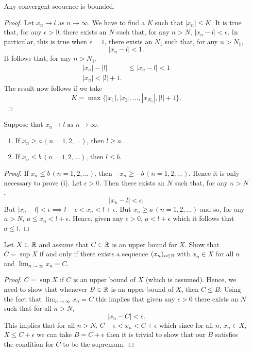 \documentclass[10pt, a4paper]{article}
\newcommand{\limas}[3][n]{#2 \rightarrow #3 \text{ as } #1 \rightarrow \infty}
\begin{document}
\begin{theorem}\label{thm_seq_convisbound}
    Any convergent sequence is bounded.
    \begin{proof}
        Let $\limas{x_n}{l}$. We have to find a $K$ such that $|x_n| \leq K$.
        It is true that, for any $\epsilon > 0$, there exists an $N$ such that, for any $n > N$, $|x_n - l| < \epsilon$. In particular, this is true when $\epsilon = 1$, there exists an $N_1$ such that, for any $n > N_1$,
        $$|x_n - l| < 1.$$
        It follows that, for any $n > N_1$,
        \begin{align*}
            |x_n| - |l| &\leq |x_n - l| < 1 \\
            |x_n| < |l| + 1.
        \end{align*}
        The result now follows if we take
        $$K = \max{\{|x_1|, |x_2|, \dotsc, |x_{N_1}|, |l| + 1\}}.$$
    \end{proof}
\end{theorem}

\begin{theorem}\label{thm_seq_convisbounds}
    Suppose that $\limas{x_n}{l}$.
    \begin{enumerate}[label = (\roman*)]
        \item If $x_n \geq a\,(n = 1, 2, \dotsc)$, then $l \geq a$.
        \item If $x_n \leq b\,(n = 1, 2, \dotsc)$, then $l \leq b$.
    \end{enumerate}
    \begin{proof}
        If $x_n \leq b\,(n = 1, 2, \dotsc)$, then $-x_n \geq -b\,(n = 1, 2, \dotsc)$. Hence it is only necessary to prove (i).
        Let $\epsilon > 0$. Then there exists an $N$ such that, for any $n > N$,
        $$|x_n - l| < \epsilon.$$
        But $|x_n - l| < \epsilon \implies l - \epsilon < x_n < l + \epsilon$. But $x_n \geq a\,(n = 1, 2, \dotsc)$ and so, for any $n > N$, $a \leq x_n < l + \epsilon$. Hence, given any $\epsilon > 0,\, a < l + \epsilon$ which it follows that $a \leq l$.
    \end{proof}
\end{theorem}

\begin{example}
    Let $X \subset \mathbb{R}$ and assume that $C \in \mathbb{R}$ is an upper bound for $X$. Show that $C = \sup X$ if and only if there exists a sequence $(x_n)_{n\in\mathbb{N}}$ with $x_n\in X$ for all $n$ and $\lim_{n\rightarrow\infty} x_n = C$.
    \begin{proof}
        $C = \sup X$ if $C$ is an upper bound of $X$ (which is assumed). Hence, we need to show that whenever $B \in \mathbb{R}$ is an upper bound of $X$, then $C \leq B$. Using the fact that $\lim_{n\rightarrow\infty} x_n = C$ this implies that given any $\epsilon > 0$ there exists an $N$ such that for all $n > N$,
        \[
        |x_n - C| < \epsilon.
        \]
        This implies that for all $n > N$, $C - \epsilon < x_n < C + \epsilon$ which since for all $n,\, x_n \in X$, $X \leq C + \epsilon$ we can take $B = C + \epsilon$ then it is trivial to show that our $B$ satisfies the condition for $C$ to be the supremum.
    \end{proof}
\end{example}
\end{document}
